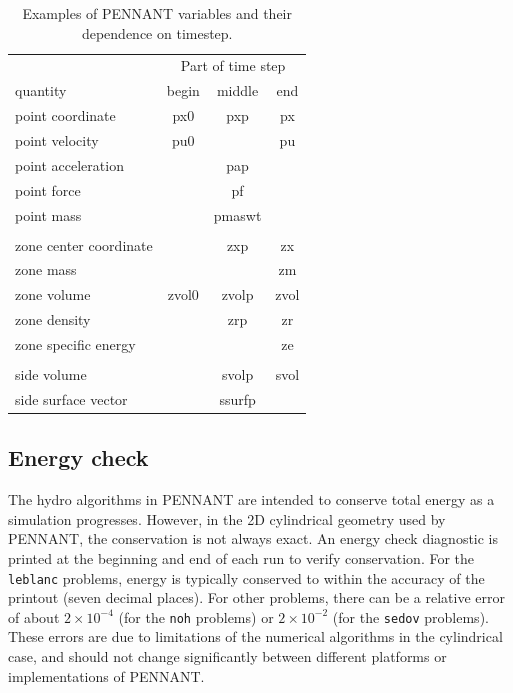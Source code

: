 \documentclass[11pt,letterpaper]{article}
\begin{document}
\begin{table}
\centering
\caption{Examples of PENNANT variables and their dependence on timestep.}
\label{tbl:timestep}
\begin{tabular}{lccc}
    \hline
    & \multicolumn{3}{c}{Part of time step} \\
    quantity & begin & middle & end \\
    \hline
    point coordinate       & px0   & pxp     & px \\
    point velocity         & pu0   &         & pu \\
    point acceleration     &       & pap \\
    point force            &       & pf \\
    point mass             &       & pmaswt \\
    \\
    zone center coordinate &       & zxp     & zx \\
    zone mass              &       &         & zm \\
    zone volume            & zvol0 & zvolp   & zvol \\
    zone density           &       & zrp     & zr \\
    zone specific energy   &       &         & ze \\
    \\
    side volume            &       & svolp   & svol \\
    side surface vector    &       & ssurfp \\
    \hline
\end{tabular}
\end{table}

\subsection{Energy check}

The hydro algorithms in PENNANT are intended to conserve total energy
as a simulation progresses.  However, in the 2D cylindrical geometry
used by PENNANT, the conservation is not always exact.  An energy
check diagnostic is printed at the beginning and end of each run to
verify conservation.  For the {\tt leblanc} problems, energy is
typically conserved to within the accuracy of the printout (seven
decimal places).  For other problems, there can be a relative error
of about $2\times 10^{-4}$ (for the {\tt noh} problems) or
$2\times 10^{-2}$ (for the {\tt sedov} problems).  These errors are
due to limitations of the numerical algorithms in the cylindrical case,
and should not change significantly between different platforms or
implementations of PENNANT.
\end{document}
